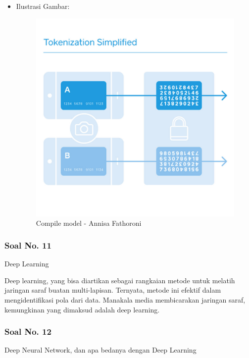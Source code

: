 \begin{itemize}
    \item Ilustrasi Gambar:

    \begin{figure}[!hbtp]
    \centering
    \includegraphics[scale=0.4]{figures/Chapter 7/1164067/Teori/Chapter7AnnisaFathoroni1.jpg}
    \caption{Compile model - Annisa Fathoroni}
    \label{Compile model - Annisa Fathoroni}
    \end{figure}
\end{itemize}

\subsubsection{Soal No. 11}
Deep Learning

\hfill \break
Deep learning, yang bisa diartikan sebagai rangkaian metode untuk melatih jaringan saraf buatan multi-lapisan. Ternyata, metode ini efektif dalam mengidentifikasi pola dari data. Manakala media membicarakan jaringan saraf, kemungkinan yang dimaksud adalah deep learning.

\subsubsection{Soal No. 12}
Deep Neural Network, dan apa bedanya dengan Deep Learning

